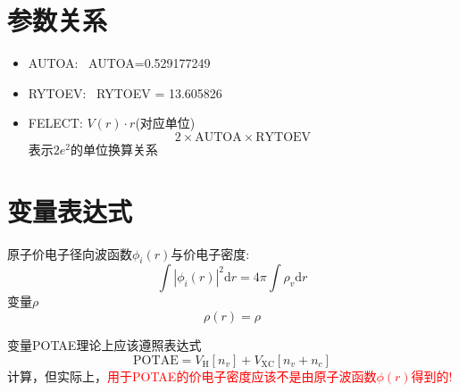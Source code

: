 \documentclass[10pt, oneside, a4paper]{article}      %
\begin{document}

\section{参数关系}
\begin{itemize}
	\item \textrm{AUTOA}:~ \textrm{AUTOA}=0.529177249
	\item \textrm{RYTOEV}:~ \textrm{RYTOEV} = 13.605826
	\item \textrm{FELECT}: $V(r)\cdot r$(对应单位)
		\begin{displaymath}
			2\times\textrm{AUTOA}\times\textrm{RYTOEV}
		\end{displaymath}
		表示$2e^2$的单位换算关系
\end{itemize}
\section{变量表达式}
原子价电子径向波函数$\phi_i(r)$与价电子密度:
\begin{equation}
	\int|\phi_i(r)|^2\mathrm{d}r =4\pi\int\rho_v\mathrm{d}r
	\label{eq:wave-charge}
\end{equation}
变量$\rho$
\begin{equation}
	\rho(r)=\rho
	\label{eq:density}
\end{equation}

变量\textrm{POTAE}理论上应该遵照表达式
\begin{equation}
	\mathrm{POTAE} = V_{\mathrm{H}}[n_v]+V_{\mathrm{XC}}[n_v+n_c]
	\label{eq:POTAE}
\end{equation}
计算，但实际上，\textcolor{red}{用于\textrm{POTAE}的价电子密度应该不是由原子波函数$\phi(r)$得到的!}
\end{document}

